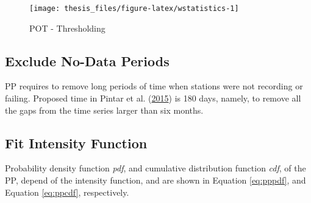 \documentclass[12pt,oneside]{reedthesis}
\begin{document}
\footnotesize
\begin{figure}

{\centering \texttt{[image: thesis\_files/figure-latex/wstatistics-1]} 

}

\caption{POT - Thresholding}\label{fig:wstatistics}
\end{figure}
\normalsize

\hypertarget{exclude-no-data-periods}{%
\subsection{Exclude No-Data Periods}\label{exclude-no-data-periods}}

PP requires to remove long periods of time when stations were not recording or failing. Proposed time in Pintar et al. (\protect\hyperlink{ref-Pintar2015}{2015}) is 180 days, namely, to remove all the gaps from the time series larger than six months.

\hypertarget{fit-intensity-function}{%
\subsection{Fit Intensity Function}\label{fit-intensity-function}}

Probability density function \emph{pdf}, and cumulative distribution function \emph{cdf}, of the PP, depend of the intensity function, and are shown in Equation \eqref{eq:pppdf}, and Equation \eqref{eq:ppcdf}, respectively.
\end{document}
